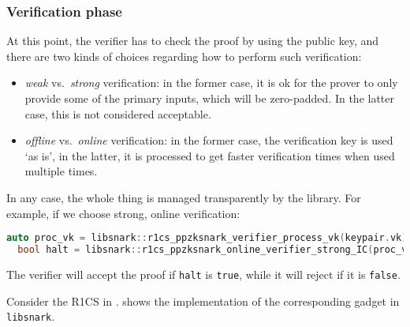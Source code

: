 \subsubsection*{Verification phase}
At this point, the verifier has to check the proof by using the public key, and there are two 
kinds of choices regarding how to perform such verification: 
\begin{itemize}
  \item \emph{weak} vs.\  \emph{strong} verification: in the former case, it is ok for the prover 
        to only provide some of the primary inputs, which will be zero-padded. 
        In the latter case, this is not considered acceptable.
  \item \emph{offline} vs.\  \emph{online} verification: in the former case, the verification key 
        is used `as is', in the latter, it is processed to get faster verification times when used 
        multiple times.
\end{itemize}
In any case, the whole thing is managed transparently by the library.
For example, if we choose strong, online verification:
\begin{lstlisting}[language=C++]
  auto proc_vk = libsnark::r1cs_ppzksnark_verifier_process_vk(keypair.vk);
  bool halt = libsnark::r1cs_ppzksnark_online_verifier_strong_IC(proc_vk, board.primary_input(), proof);
\end{lstlisting}
The verifier will accept the proof if \texttt{halt} is \texttt{true}, while it will reject if it 
is \texttt{false}.

\begin{example}
  Consider the R1CS in .
   shows the implementation of the corresponding gadget in 
  \texttt{libsnark}.
\end{example}

